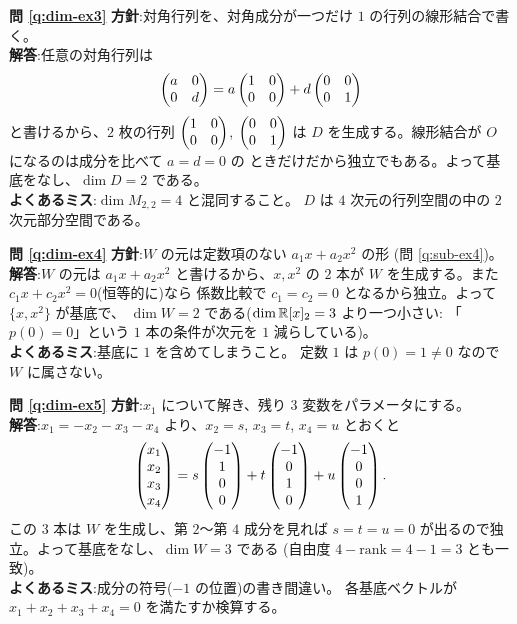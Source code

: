 \bigskip
\noindent\textbf{問 \ref{q:dim-ex3}}\quad
\textbf{方針}:対角行列を、対角成分が一つだけ $1$ の行列の線形結合で書く。\\
\textbf{解答}:任意の対角行列は
\[
\begin{pmatrix}a & 0 \\ 0 & d\end{pmatrix} = a\begin{pmatrix}1 & 0 \\ 0 & 0\end{pmatrix} + d\begin{pmatrix}0 & 0 \\ 0 & 1\end{pmatrix}
\]
と書けるから、$2$ 枚の行列 $\begin{pmatrix}1 & 0 \\ 0 & 0\end{pmatrix}$, $\begin{pmatrix}0 & 0 \\ 0 & 1\end{pmatrix}$
は $D$ を生成する。線形結合が $O$ になるのは成分を比べて $a = d = 0$ の
ときだけだから独立でもある。よって基底をなし、$\dim D = 2$ である。\\
\textbf{よくあるミス}:$\dim M_{2,2} = 4$ と混同すること。
$D$ は $4$ 次元の行列空間の中の $2$ 次元部分空間である。

\bigskip
\noindent\textbf{問 \ref{q:dim-ex4}}\quad
\textbf{方針}:$W$ の元は定数項のない $a_1 x + a_2 x^2$ の形
(問 \ref{q:sub-ex4})。\\
\textbf{解答}:$W$ の元は $a_1 x + a_2 x^2$ と書けるから、$x, x^2$ の
$2$ 本が $W$ を生成する。また $c_1 x + c_2 x^2 = 0$(恒等的に)なら
係数比較で $c_1 = c_2 = 0$ となるから独立。よって $\{x, x^2\}$ が基底で、
$\dim W = 2$ である($\dim \mathbb{R}[x]_2 = 3$ より一つ小さい:
「$p(0) = 0$」という $1$ 本の条件が次元を $1$ 減らしている)。\\
\textbf{よくあるミス}:基底に $1$ を含めてしまうこと。
定数 $1$ は $p(0) = 1 \neq 0$ なので $W$ に属さない。

\bigskip
\noindent\textbf{問 \ref{q:dim-ex5}}\quad
\textbf{方針}:$x_1$ について解き、残り $3$ 変数をパラメータにする。\\
\textbf{解答}:$x_1 = -x_2 - x_3 - x_4$ より、$x_2 = s$, $x_3 = t$,
$x_4 = u$ とおくと
\[
\begin{pmatrix}x_1 \\ x_2 \\ x_3 \\ x_4\end{pmatrix}
= s\begin{pmatrix}-1 \\ 1 \\ 0 \\ 0\end{pmatrix} + t\begin{pmatrix}-1 \\ 0 \\ 1 \\ 0\end{pmatrix}
+ u\begin{pmatrix}-1 \\ 0 \\ 0 \\ 1\end{pmatrix}.
\]
この $3$ 本は $W$ を生成し、第 $2$〜第 $4$ 成分を見れば
$s = t = u = 0$ が出るので独立。よって基底をなし、$\dim W = 3$ である
(自由度 $4 - \mathrm{rank} = 4 - 1 = 3$ とも一致)。\\
\textbf{よくあるミス}:成分の符号($-1$ の位置)の書き間違い。
各基底ベクトルが $x_1 + x_2 + x_3 + x_4 = 0$ を満たすか検算する。

